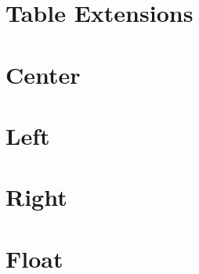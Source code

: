 
\chapter{\label{table-extensions}Table Extensions}
\chapter{\label{center}Center}
\chapter{\label{left}Left}
\chapter{\label{right}Right}
\chapter{\label{float}Float}